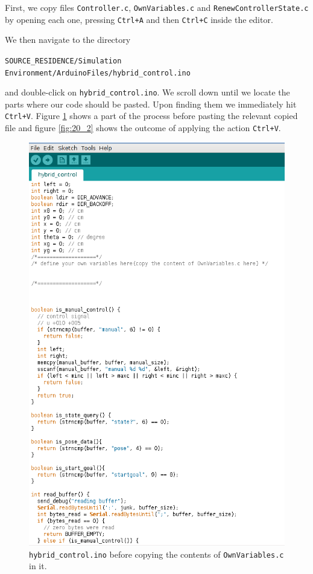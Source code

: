 First, we copy files \texttt{Controller.c}, \texttt{OwnVariables.c} and
\texttt{RenewControllerState.c} by opening each one, pressing \texttt{Ctrl+A}
and then \texttt{Ctrl+C} inside the editor.

We then navigate to the directory

\texttt{SOURCE\_RESIDENCE/Simulation Environment/ArduinoFiles/hybrid\_control.ino}

and double-click on \texttt{hybrid\_control.ino}. We scroll down until we locate
the parts where our code should be pasted. Upon finding them we immediately hit
\texttt{Ctrl+V}. Figure \ref{fig:20_1} shows a part of the process before
pasting the relevant copied file and figure \ref{fig:20_2} shows the outcome of
applying the action \texttt{Ctrl+V}.

\begin{figure}[H]
  \includegraphics[scale=0.6]{./figures/task_20/1.png}
  \caption{\texttt{hybrid\_control.ino} before copying the contents of
    \texttt{OwnVariables.c} in it.}
  \label{fig:20_1}
\end{figure}

